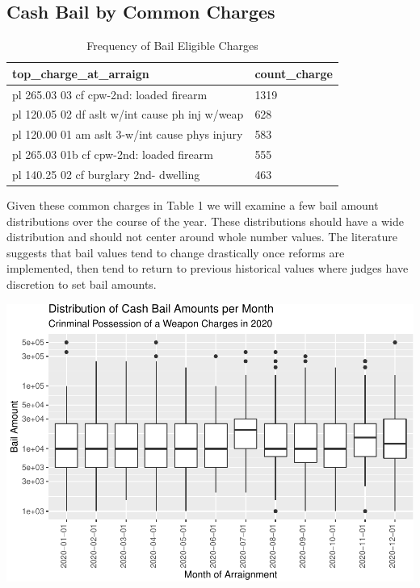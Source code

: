 \documentclass[
  english,
  man]{apa6}
\begin{document}
\hypertarget{cash-bail-by-common-charges}{%
\subsection{Cash Bail by Common Charges}\label{cash-bail-by-common-charges}}

\begin{table}[h]

\begin{center}
\begin{threeparttable}

\caption{\label{tab:most_common_charges}Frequency of Bail Eligible Charges}

\begin{tabular}{ll}
\toprule
top\_charge\_at\_arraign & \multicolumn{1}{c}{count\_charge}\\
\midrule
pl 265.03 03 cf cpw-2nd: loaded firearm & 1319\\
pl 120.05 02 df aslt w/int cause ph inj w/weap & 628\\
pl 120.00 01 am aslt 3-w/int cause phys injury & 583\\
pl 265.03 01b cf cpw-2nd: loaded firearm & 555\\
pl 140.25 02 cf burglary 2nd- dwelling & 463\\
\bottomrule
\end{tabular}

\end{threeparttable}
\end{center}

\end{table}

Given these common charges in Table 1 we will examine a few bail amount distributions over the course of the year. These distributions should have a wide distribution and should not center around whole number values. The literature suggests that bail values tend to change drastically once reforms are implemented, then tend to return to previous historical values where judges have discretion to set bail amounts.

\includegraphics{bail_reform_shamp_thesis_files/figure-latex/charge_distrb_cpw-1.pdf}
\end{document}

